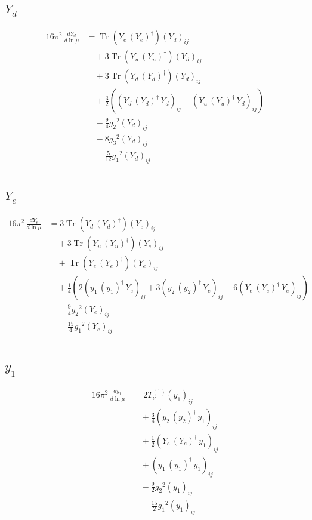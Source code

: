 \documentclass[10pt,a4paper]{article}
\begin{document}
\subsection*{$Y_d$}
\begin{align*}
16\pi^2\,\frac{d Y_d}{d\ln\mu} &=\operatorname{Tr}\!\left({Y_e}\,\left({Y_e}\right)^{\dagger}\right) \left({Y_d}\right)_{ij} \\
&\quad +3 \operatorname{Tr}\!\left({Y_u}\,\left({Y_u}\right)^{\dagger}\right) \left({Y_d}\right)_{ij} \\
&\quad +3 \operatorname{Tr}\!\left({Y_d}\,\left({Y_d}\right)^{\dagger}\right) \left({Y_d}\right)_{ij} \\
&\quad +\frac{3}{2} (\left({Y_d}\,\left({Y_d}\right)^{\dagger}\,{Y_d}\right)_{ij}-\left({Y_u}\,\left({Y_u}\right)^{\dagger}\,{Y_d}\right)_{ij}) \\
&\quad -\frac{9}{4} {g_2}^2 \left({Y_d}\right)_{ij} \\
&\quad -8 {g_3}^2 \left({Y_d}\right)_{ij} \\
&\quad -\frac{5}{12} {g_1}^2 \left({Y_d}\right)_{ij} \\
\end{align*}
\subsection*{$Y_e$}
\begin{align*}
16\pi^2\,\frac{d Y_e}{d\ln\mu} &=3 \operatorname{Tr}\!\left({Y_d}\,\left({Y_d}\right)^{\dagger}\right) \left({Y_e}\right)_{ij} \\
&\quad +3 \operatorname{Tr}\!\left({Y_u}\,\left({Y_u}\right)^{\dagger}\right) \left({Y_e}\right)_{ij} \\
&\quad +\operatorname{Tr}\!\left({Y_e}\,\left({Y_e}\right)^{\dagger}\right) \left({Y_e}\right)_{ij} \\
&\quad +\frac{1}{4} (2 \left({y_1}\,\left({y_1}\right)^{\dagger}\,{Y_e}\right)_{ij}+3 \left({y_2}\,\left({y_2}\right)^{\dagger}\,{Y_e}\right)_{ij}+6 \left({Y_e}\,\left({Y_e}\right)^{\dagger}\,{Y_e}\right)_{ij}) \\
&\quad -\frac{9}{4} {g_2}^2 \left({Y_e}\right)_{ij} \\
&\quad -\frac{15}{4} {g_1}^2 \left({Y_e}\right)_{ij} \\
\end{align*}
\subsection*{$y_1$}
\begin{align*}
16\pi^2\,\frac{d y_1}{d\ln\mu} &=2 T_{\nu}^{(1)} \left({y_1}\right)_{ij} \\
&\quad +\frac{3}{4} \left({y_2}\,\left({y_2}\right)^{\dagger}\,{y_1}\right)_{ij} \\
&\quad +\frac{1}{2} \left({Y_e}\,\left({Y_e}\right)^{\dagger}\,{y_1}\right)_{ij} \\
&\quad +\left({y_1}\,\left({y_1}\right)^{\dagger}\,{y_1}\right)_{ij} \\
&\quad -\frac{9}{2} {g_2}^2 \left({y_1}\right)_{ij} \\
&\quad -\frac{15}{2} {g_1}^2 \left({y_1}\right)_{ij} \\
\end{align*}
\end{document}
